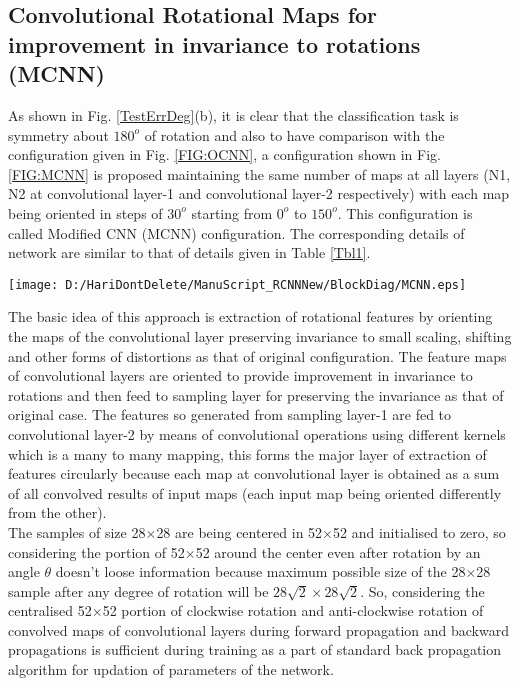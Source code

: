    
\subsection{Convolutional Rotational Maps for improvement in invariance to rotations (MCNN) }
\label{MCNNConfig}

As shown in Fig. \ref{TestErrDeg}(b), it is clear that the classification task is symmetry about $180^o$ of rotation and also to have comparison with the configuration given in Fig. \ref{FIG:OCNN}, a configuration shown in Fig. \ref{FIG:MCNN} is proposed maintaining the same number of maps at all layers (N1, N2 at convolutional layer-1 and convolutional layer-2 respectively) with each map being oriented in steps of $30^o$ starting from $0^o$ to $150^o$. This configuration is called Modified CNN (MCNN) configuration. The corresponding details of network are similar to that of details given in Table \ref{Tbl1}. \\

\begin{figure*}
\centering
\texttt{[image: D:/HariDontDelete/ManuScript\_RCNNNew/BlockDiag/MCNN.eps]}
\caption{CNN Architecture with rotated convolutional maps}
\label{FIG:MCNN}
\end{figure*}

The basic idea of this approach is extraction of rotational features by orienting the maps of the convolutional layer preserving invariance to small scaling, shifting and other forms of distortions as that of original configuration. The feature maps of convolutional layers are oriented to provide improvement in invariance to rotations and then feed to sampling layer for preserving the invariance as that of original case. The features so generated from sampling layer-1 are fed to convolutional layer-2 by means of convolutional operations using different kernels which is a many to many mapping, this forms the major layer of extraction of features circularly because each map at convolutional layer is obtained as a sum of all convolved results of input maps (each input map being oriented differently from the other). \\

The samples of size 28$\times$28 are being centered in 52$\times$52 and initialised to zero, so considering the portion of 52$\times$52 around the center even after rotation by an angle $\theta$ doesn't loose information because maximum possible size of the 28$\times$28 sample after any degree of rotation will be $28\sqrt{2} \times 28\sqrt{2}$. So, considering the centralised 52$\times$52 portion of clockwise rotation and anti-clockwise rotation of convolved maps of convolutional layers during forward propagation and backward propagations is sufficient during training as a part of standard back propagation algorithm for updation of parameters of the network. \\

